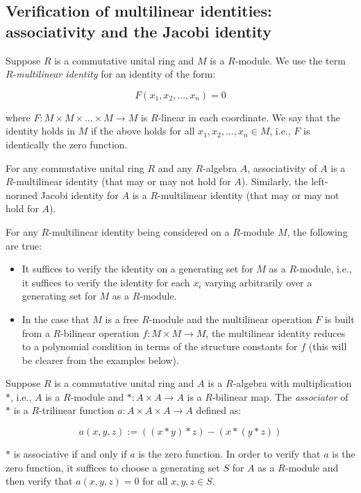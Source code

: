 \subsection{Verification of multilinear identities: associativity and the Jacobi identity}\label{appsec:multilinear}

Suppose $R$ is a commutative unital ring and $M$ is a $R$-module. We
use the term $R$-{\em multilinear identity} for an identity of the
form:

$$F(x_1,x_2,\dots,x_n) = 0$$

where $F: M \times M \times \dots \times M \to M$ is $R$-linear in
each coordinate. We say that the identity holds in $M$ if the above
holds for all $x_1,x_2,\dots,x_n \in M$, i.e., $F$ is identically the
zero function.

For any commutative unital ring $R$ and any $R$-algebra $A$,
associativity of $A$ is a $R$-multilinear identity (that may or may
not hold for $A$). Similarly, the left-normed Jacobi identity for $A$
is a $R$-multilinear identity (that may or may not hold for $A$).

For any $R$-multilinear identity being considered on a $R$-module $M$,
the following are true:

\begin{itemize}
\item It suffices to verify the identity on a generating set for $M$
  as a $R$-module, i.e., it suffices to verify the identity for each
  $x_i$ varying arbitrarily over a generating set for $M$ as a
  $R$-module.
\item In the case that $M$ is a free $R$-module and the multilinear
  operation $F$ is built from a $R$-bilinear operation $f: M \times M
  \to M$, the multilinear identity reduces to a polynomial condition
  in terms of the structure constants for $f$ (this will be clearer
  from the examples below).
\end{itemize}

Suppose $R$ is a commutative unital ring and $A$ is a $R$-algebra with
multiplication $*$, i.e., $A$ is a $R$-module and $*:A \times A \to A$
is a $R$-bilinear map. The {\em associator} of $*$ is a $R$-trilinear
function $a: A \times A \times A \to A$ defined as:

$$a(x,y,z) := ((x * y) * z) - (x * (y * z))$$

$*$ is associative if and only if $a$ is the zero function. In order
to verify that $a$ is the zero function, it suffices to choose a
generating set $S$ for $A$ as a $R$-module and then verify that
$a(x,y,z) = 0$ for all $x,y,z \in S$.

